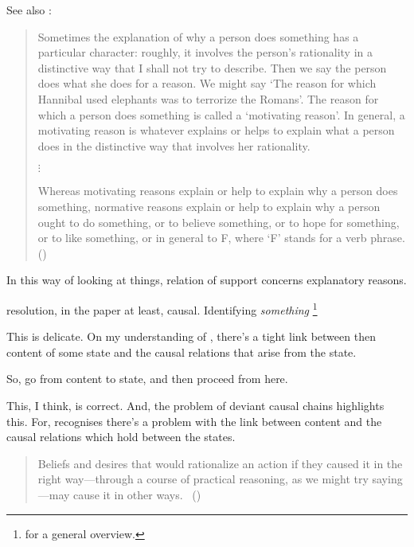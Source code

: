 \begin{note}
{    See also \citeauthor{Broome:2013aa}:
    \begin{quote}
      Sometimes the explanation of why a person does something has a particular character:
      roughly, it involves the person's rationality in a distinctive way that I shall not try to describe.
      Then we say the person does what she does for a reason.
      We might say ‘The reason for which Hannibal used elephants was to terrorize the Romans'.
      The reason for which a person does something is called a ‘motivating reason'.
      In general, a motivating reason is whatever explains or helps to explain what a person does in the distinctive way that involves her rationality.

      \mbox{}\hfill\(\vdots\)\hfill\mbox{}

      Whereas motivating reasons explain or help to explain why a person does something, normative reasons explain or help to explain why a person ought to do something, or to believe something, or to hope for something, or to like something, or in general to F, where ‘F' stands for a verb phrase.%
      \mbox{}\hfill\mbox{(\citeyear[46--47]{Broome:2013aa})}
    \end{quote}
  }

  In this way of looking at things, relation of support concerns explanatory reasons.
\end{note}

\begin{note}
  \citeauthor{Davidson:1963aa} resolution, in the \citeyear{Davidson:1963aa} paper at least, causal.
  Identifying \emph{something}%
  \footnote{
    \textcite{Hieronymi:2011aa} for a general overview.
  }
\end{note}

\begin{note}
  This is delicate.
  On my understanding of \citeauthor{Davidson:1963aa}, there's a tight link between then content of some state and the causal relations that arise from the state.

  So, go from content to state, and then proceed from here.

  This, I think, is correct.
  And, the problem of deviant causal chains highlights this.
  For, \citeauthor{Davidson:1963aa} recognises there's a problem with the link between content and the causal relations which hold between the states.

  \begin{quote}
    Beliefs and desires that would rationalize an action if they caused it in the right way—through a course of practical reasoning, as we might try saying---may cause it in other ways.%
    \mbox{ }\hfill\mbox{(\citeyear[79]{Davidson:1973vd})}
  \end{quote}
\end{note}

